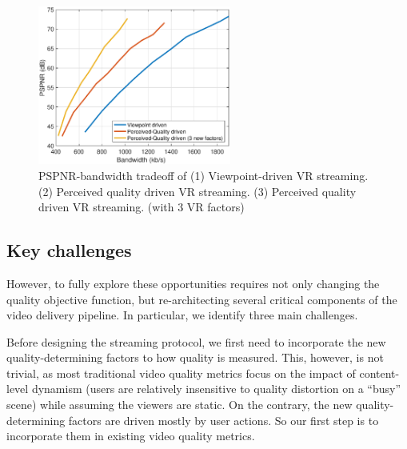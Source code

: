 \begin{figure}
  \centering
  \includegraphics[width=2.5in]{images/improvement.eps}
  \caption{PSPNR-bandwidth tradeoff of (1) Viewpoint-driven VR streaming. (2) Perceived quality driven VR streaming. (3) Perceived quality driven VR streaming. (with 3 VR factors)}
  \label{fig:potential}
  \end{figure}




\subsection{Key challenges}

However, to fully explore these opportunities requires not only changing the quality objective function, but re-architecting several critical components of the video delivery pipeline. 
In particular, we identify three main challenges.


Before designing the streaming protocol, we first need to incorporate the new quality-determining factors to how \vrvideo quality is measured. 
This, however, is not trivial, as most traditional video quality metrics focus on the impact of content-level dynamism (\eg users are relatively insensitive to quality distortion on a ``busy'' scene) while assuming the viewers are static.
On the contrary, the new quality-determining factors are driven mostly by user actions. 
So our first step is to incorporate them in existing video quality metrics.


